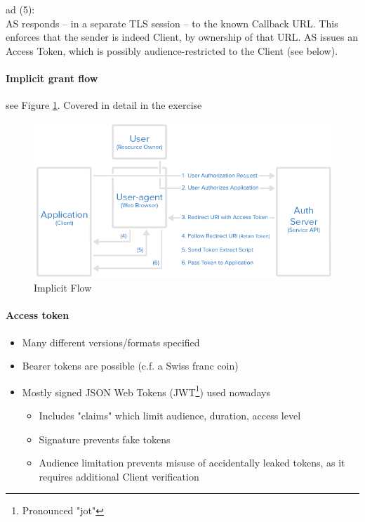 ad (5):\\
AS responds -- in a separate TLS session -- to the known Callback URL. This enforces that the sender is indeed Client, by ownership of that URL. AS issues an Access Token, which is possibly audience-restricted to the Client (see below).

\paragraph{Implicit grant flow} see Figure \ref{fig:oauth-implicit-flow}. Covered in detail in the exercise

\begin{figure}[h]
    \centering
    \includegraphics[width=13cm]{images/ch9-oauth-implicit-flow.png}
    \caption{Implicit Flow}
    \label{fig:oauth-implicit-flow}
\end{figure}
 
 \paragraph{Access token}
 \begin{itemize}
     \item Many different versions/formats specified
     \item Bearer tokens are possible (c.f. a Swiss franc coin)
     \item Mostly signed JSON Web Tokens (JWT\footnote{Pronounced "jot"}) used nowadays
     \begin{itemize}
         \item Includes "claims" which limit audience, duration, access level
         \item Signature prevents fake tokens
         \item Audience limitation prevents misuse of accidentally leaked tokens, as it requires additional Client verification
     \end{itemize}
 \end{itemize}
 
